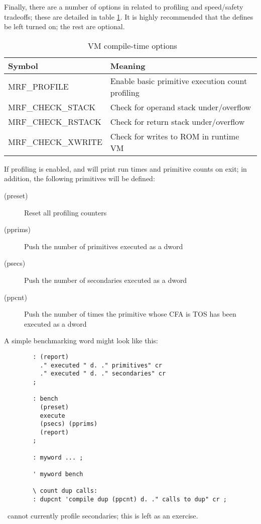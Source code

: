\documentclass{article}
\begin{document}
Finally, there are a number of  options in 
related to profiling and speed/safety tradeoffs; these are detailed in
table \ref{t:defs}. It is highly recommended that the 
defines be left turned on; the rest are optional.
\begin{table}
\begin{center}
\begin{tabular}{|l|l|} \hline
\textbf{Symbol} & \textbf{Meaning} \\ \hline
MRF\_PROFILE & Enable basic primitive execution count profiling \\ \hline
MRF\_CHECK\_STACK & Check for operand stack under/overflow \\ \hline
MRF\_CHECK\_RSTACK & Check for return stack under/overflow \\ \hline
MRF\_CHECK\_XWRITE & Check for writes to ROM in runtime VM \\ \hline
\end{tabular}
\end{center}
\caption{\M\ VM compile-time options}
\label{t:defs}
\end{table}
If profiling is enabled,  and  will print
run times and primitive counts on exit; in addition, the following
primitives will be defined:
\begin{description}
\item[(preset)] Reset all profiling counters
\item[(pprims)] Push the number of primitives executed as a dword
\item[(psecs)] Push the number of secondaries executed as a dword
\item[(ppcnt)] Push the number of times the primitive whose CFA is TOS
  has been executed as a dword
\end{description}
A simple benchmarking word might look like this:
\begin{verbatim}
        : (report)
          ." executed " d. ." primitives" cr
          ." executed " d. ." secondaries" cr
        ;

        : bench
          (preset)
          execute
          (psecs) (pprims)
          (report)
        ;

        : myword ... ;

        ' myword bench

        \ count dup calls:
        : dupcnt 'compile dup (ppcnt) d. ." calls to dup" cr ;
\end{verbatim}
\M\ cannot currently profile secondaries; this is left as an exercise.
\end{document}
